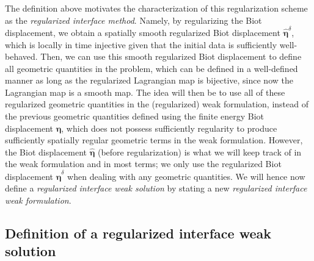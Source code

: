 \documentclass[11pt]{article}
\newcommand{\bd}{\boldsymbol}
\theoremstyle{definition}
\begin{document}
The definition above motivates the characterization of this regularization scheme as the \textit{regularized interface method}. Namely, by regularizing the Biot displacement, we obtain a spatially smooth regularized Biot displacement $\hat{\bd{\eta}}^{\delta}$, which is locally in time injective given that the initial data is sufficiently well-behaved. Then, we can use this smooth regularized Biot displacement to define all geometric quantities in the problem, which can be defined in a well-defined manner as long as the regularized Lagrangian map is bijective, since now the Lagrangian map is a smooth map. The idea will then be to use all of these regularized geometric quantities in the (regularized) weak formulation, instead of the previous geometric quantities defined using the finite energy Biot displacement $\hat{\bd{\eta}}$, which does not possess sufficiently regularity to produce sufficiently spatially regular geometric terms in the weak formulation. However, the Biot displacement $\hat{\bd{\eta}}$ (before regularization) is what we will keep track of in the weak formulation and in most terms; we only use the regularized Biot displacement $\hat{\bd{\eta}}^{\delta}$ when dealing with any geometric quantities. We will hence now define a \textit{regularized interface weak solution} by stating a new \textit{regularized interface weak formulation}.

\subsection{Definition of a regularized interface weak solution}
\end{document}
